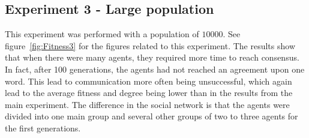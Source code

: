 \clearpage
\subsection{Experiment 3 - Large population}
This experiment was performed with a population of $10000$. See figure~\ref{fig:Fitness3} for the figures related to this experiment. The results show that when there were many agents, they required more time to reach consensus. In fact, after 100 generations, the agents had not reached an agreement upon one word. This lead to communication more often being unsuccessful, which again lead to the average fitness and degree being lower than in the results from the main experiment. The difference in the social network is that the agents were divided into one main group and several other groups of two to three agents for the first generations.


